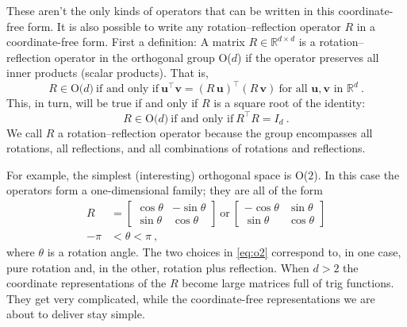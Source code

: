 \documentclass{article}
\newcommand{\Evec}[1]{{\mathbf{#1}}} %
\begin{document}
These aren't the only kinds of operators that can be written in this coordinate-free form.
It is also possible to write any rotation--reflection operator $R$ in a coordinate-free form.
First a definition: A matrix $R\in\mathbb{R}^{d\times d}$ is a rotation--reflection operator in the orthogonal group O($d$) if the operator preserves all inner products (scalar products).
That is,
\begin{equation}
    R \in \mbox{O($d$)} ~ \mbox{if and only if} ~ \Evec{u}^\top\Evec{v}=(R\,\Evec{u})^\top(R\,\Evec{v}) ~ \mbox{for all $\Evec{u},\Evec{v}$ in $\mathbb{R}^d$} ~.\label{eq:orth1}
\end{equation}
This, in turn, will be true if and only if $R$ is a square root of the identity:
\begin{equation}
    R \in \mbox{O($d$)} ~ \mbox{if and only if} ~ R^\top R=I_d ~.\label{eq:orth2}
\end{equation}
We call $R$ a rotation--reflection operator because the group encompasses all rotations, all reflections, and all combinations of rotations and reflections.

For example, the simplest (interesting) orthogonal space is O($2$). In this case the operators form a one-dimensional family; they are all of the form
\begin{align}
    R &= \begin{bmatrix}\cos{\theta} & -\sin{\theta} \\ \sin{\theta} & \cos{\theta}\end{bmatrix} ~\mbox{or}~
    \begin{bmatrix}-\cos{\theta} & \sin{\theta} \\ \sin{\theta} & \cos{\theta}\end{bmatrix} \label{eq:o2}
    \\
    -\pi &< \theta < \pi ~, \nonumber
\end{align}
where $\theta$ is a rotation angle.
The two choices in \eqref{eq:o2} correspond to, in one case, pure rotation and, in the other, rotation plus reflection.
When $d>2$ the coordinate representations of the $R$ become large matrices full of trig functions.
They get very complicated, while the coordinate-free representations we are about to deliver stay simple.
\end{document}
